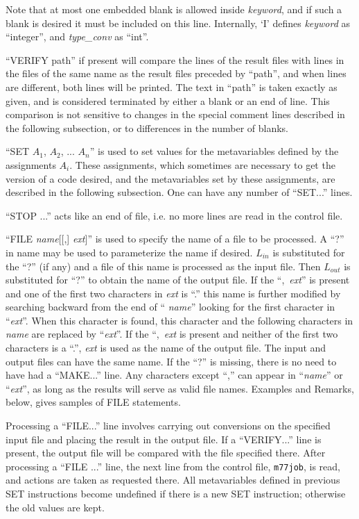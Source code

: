 \documentclass[twoside]{MATH77}
\begin{document}
Note that at most one embedded blank is allowed inside {\em keyword},
and if such a blank is desired it must be included on this line.
Internally, `I' defines {\em keyword} as ``integer'', and {\em
type\_conv} as ``int''.

``VERIFY path'' if present will compare the lines of the result files
with lines in the files of the same name as the result files preceded
by ``path'', and when lines are different, both lines will be printed.
The text in ``path'' is taken exactly as given, and is considered
terminated by either a blank or an end of line.  This comparison is
not sensitive to changes in the special comment lines described in
the following subsection, or to differences in the number of
blanks.

``SET $A_1$, $A_2$, ... $A_n$'' is used to set values for the
metavariables defined by the assignments $A_i$.  These assignments, which
sometimes are necessary to get the version of a code desired, and the
metavariables set by these assignments, are described in the following
subsection.  One can have any number of ``SET...'' lines.

``STOP ...'' acts like an end of file, i.e. no more lines are read in
the control file.

``FILE {\em name}[[,] {\em ext}]'' is used to specify the name of a file
to be processed.  A ``?'' in name may be used to parameterize the name if
desired.  $L_{in}$ is substituted for the ``?'' (if any) and a file of
this name is processed as the input file.  Then $L_{out}$ is substituted
for ``?'' to obtain the name of the output file.  If the ``,~{\em ext}\/''
is present and one of the first two characters in {\em ext} is ``.'' this
name is further modified by searching backward from the end of ``{\em
name}\/'' looking for the first character in ``{\em ext}\/''.  When this
character is found, this character and the following characters in {\em
name} are replaced by ``{\em ext}\/''.  If the ``,~{\em ext} is present
and neither of the first two characters is a ``.'', {\em ext} is used as
the name of the output file.  The input and output files can have the same
name.  If the ``?'' is missing, there is no need to have had a ``MAKE...''
line.  Any characters except ``,'' can appear in ``{\em name}\/'' or
``{\em ext}\/'', as long as the results will serve as valid file names.
Examples and Remarks, below, gives samples of FILE statements.

Processing a ``FILE...'' line involves carrying out conversions on
the specified input file and placing the result in the output file.
If a ``VERIFY...'' line is present, the output file will be compared
with the file specified there.  After processing a ``FILE ...'' line,
the next line from the control file, {\tt m77job}, is read, and
actions are taken as requested there.  All metavariables defined in
previous SET instructions become undefined if there is a new SET
instruction; otherwise the old values are kept.
\end{document}
